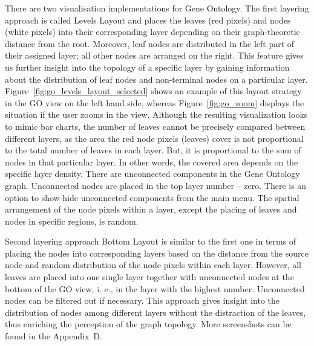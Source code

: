 There are two visualisation implementations for Gene Ontology. The first layering approach is called Levels Layout and places the leaves (red pixels) and nodes (white pixels) into their corresponding layer depending on their graph-theoretic distance from the root. Moreover, leaf nodes are distributed in the left part of their assigned layer; all other nodes are arranged on the right. This feature gives us further insight into the topology of a specific layer by gaining information about the distribution of leaf nodes and non-terminal nodes on a particular layer. Figure~\ref{fig:go_levels_layout_selected} shows an example of this layout strategy in the GO view on the left hand side, whereas Figure~\ref{fig:go_zoom} displays the situation if the user zooms in the view. Although the resulting visualization looks to mimic bar charts, the number of leaves cannot be precisely compared between different layers, as the area the red node pixels (leaves) cover is not proportional to the total number of leaves in each layer. But, it is proportional to the sum of nodes in that particular layer. In other words, the covered area depends on the specific layer density. There are unconnected components in the Gene Ontology graph. Unconnected nodes are placed in the top layer number -- zero. There is an option to show-hide unconnected components from the main menu. The spatial arrangement of the node pixels within a layer, except the placing of leaves and nodes in specific regions, is random.

Second layering approach Bottom Layout is similar to the first one in terms of placing the nodes into corresponding layers based on the distance from the source node and random distribution of the node pixels within each layer. However, all leaves are placed into one single layer together with unconnected nodes at the bottom of the GO view, i. e., in the layer with the highest number. Unconnected nodes can be filtered out if necessary. This approach gives insight into the distribution of nodes among different layers without the distraction of the leaves, thus enriching the perception of the graph topology. More screenshots can be found in the Appendix~D.

